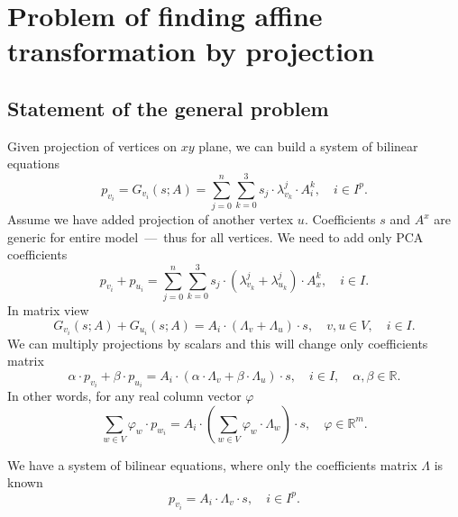 \section{Problem of finding affine transformation by projection}

\subsection{Statement of the general problem}

Given projection of vertices on $xy$ plane,
we can build a system of bilinear equations
\begin{equation*}
  p_{v_i}
  = G_{v_i}\left( s; A \right)
  = \sum\limits_{j = 0}^{n} \sum\limits_{k = 0}^{3}
    s_{j} \cdot \lambda^{j}_{v_k} \cdot A_i^{k},
  \quad i \in I^p.
\end{equation*}
Assume we have added projection of another vertex $u$.
Coefficients $s$ and $A^x$ are generic
for entire model~---~thus for all vertices.
We need to add only PCA coefficients
\begin{equation*}
  p_{v_i} + p_{u_i}
  = \sum\limits_{j = 0}^{n} \sum\limits_{k = 0}^{3}
    s_{j} \cdot \left( \lambda^{j}_{v_k} + \lambda^{j}_{u_k} \right)
    \cdot A_x^{k},
  \quad i \in I.
\end{equation*}
In matrix view
\begin{equation*}
  G_{v_i}\left( s; A \right) + G_{u_i}\left( s; A \right)
  = A_i \cdot \left( \Lambda_v + \Lambda_u \right) \cdot s,
  \quad v, u \in V,
  \quad i \in I.
\end{equation*}
We can multiply projections by scalars
and this will change only coefficients matrix
\begin{equation*}
  \alpha \cdot p_{v_i} + \beta \cdot p_{u_i}
  = A_i
    \cdot \left( \alpha \cdot \Lambda_v + \beta \cdot \Lambda_u \right)
    \cdot s,
  \quad i \in I,
  \quad \alpha, \beta \in \mathbb{R}.
\end{equation*}
In other words, for any real column vector $\varphi$
\begin{equation*}
  \sum_{w \in V} \varphi_w \cdot p_{w_i}
  = A_i
    \cdot \left( \sum_{w \in V} \varphi_w \cdot \Lambda_w \right)
    \cdot s,
  \quad \varphi \in \mathbb{R}^m.
\end{equation*}

We have a system of bilinear equations,
where only the coefficients matrix $\Lambda$ is known
\begin{equation}\label{eq:bilinear:matrix}
  p_{v_i}
  = A_i \cdot \Lambda_v \cdot s,
  \quad i \in I^p.
\end{equation}

